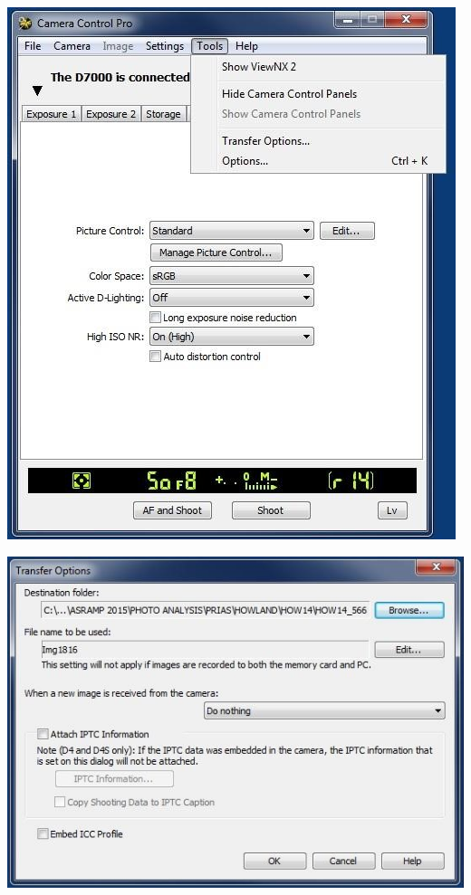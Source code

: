 \documentclass[
]{book}
\begin{document}
\includegraphics{images/Camera16.jpg}

\includegraphics{images/Camera17.jpg}
\end{document}
